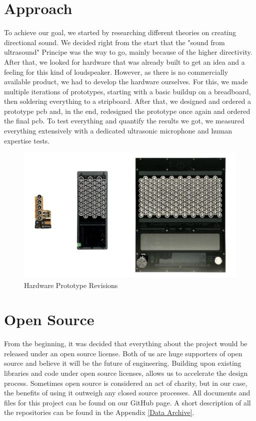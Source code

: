 \section{Approach}
To achieve our goal, we started by researching different theories on creating directional sound.
We decided right from the start that the "sound from ultrasound" Principe was the way to go, mainly because of the higher directivity.
After that, we looked for hardware that was already built to get an idea and a feeling for this kind of loudspeaker. However, as there is no commercially available product, we had to develop the hardware ourselves.
For this, we made multiple iterations of prototypes, starting with a basic buildup on a breadboard, then soldering everything to a stripboard. After that, we designed and ordered a prototype \acrshort{pcb} and, in the end, redesigned the prototype once again and ordered the final \acrshort{pcb}.  
To test everything and quantify the results we got, we measured everything extensively with a dedicated ultrasonic microphone and human expertise tests.

\begin{figure}[h!]
	\centering
	\includegraphics[width=\textwidth]{images/1_Introduction/Approach.jpg}
	\vspace{-0.4cm}
    \caption{Hardware Prototype Revisions}
    \label{fig:prototype_revisions}
\end{figure}


\section{Open Source}
From the beginning, it was decided that everything about the project would be released under an open source license. Both of us are huge supporters of open source and believe it will be the future of engineering. Building upon existing libraries and code under open source licenses, allows us to accelerate the design process. Sometimes open source is considered an act of charity, but in our case, the benefits of using it outweigh any closed source processes. All documents and files for this project can be found on our GitHub page. A short description of all the repositories can be found in the Appendix \ref{Data Archive}.

